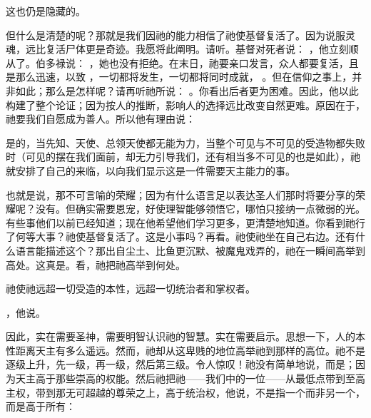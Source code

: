 这也仍是隐藏的。\par

但什么是清楚的呢？那就是我们因祂的能力相信了祂使基督复活了。因为说服灵魂，远比复活尸体更是奇迹。我愿将此阐明。请听。基督对死者说： ，他立刻顺从了。伯多禄说： ，她也没有拒绝。在末日，祂要亲口发言，众人都要复活，且是那么迅速，以致 ，一切都将发生，一切都将同时成就， 。但在信仰之事上，并非如此；那么是怎样呢？请再听祂所说： 。你看出后者更为困难。因此，他以此构建了整个论证；因为按人的推断，影响人的选择远比改变自然更难。原因在于，祂要我们自愿成为善人。所以他有理由说：\par

\par

是的，当先知、天使、总领天使都无能为力，当整个可见与不可见的受造物都失败时（可见的摆在我们面前，却无力引导我们，还有相当多不可见的也是如此），祂就安排了自己的来临，以向我们显示这是一件需要天主能力的事。\par

\par

也就是说，那不可言喻的荣耀；因为有什么语言足以表达圣人们那时将要分享的荣耀呢？没有。但确实需要恩宠，好使理智能够领悟它，哪怕只接纳一点微弱的光。有些事他们以前已经知道；现在他希望他们学习更多，更清楚地知道。你看到祂行了何等大事？祂使基督复活了。这是小事吗？再看。祂使祂坐在自己右边。还有什么语言能描述这个？那出自尘土、比鱼更沉默、被魔鬼戏弄的，祂在一瞬间高举到高处。这真是。看，祂把祂高举到何处。\par

\par

祂使祂远超一切受造的本性，远超一切统治者和掌权者。\par

，他说。\par

因此，实在需要圣神，需要明智认识祂的智慧。实在需要启示。思想一下，人的本性距离天主有多么遥远。然而，祂却从这卑贱的地位高举祂到那样的高位。祂不是逐级上升，先一级，再一级，然后第三级。令人惊叹！祂没有简单地说，而是；因为天主高于那些崇高的权能。然后祂把祂——我们中的一位——从最低点带到至高主权，带到那无可超越的尊荣之上，高于统治权，他说，不是指一个而非另一个，而是高于所有：\par

